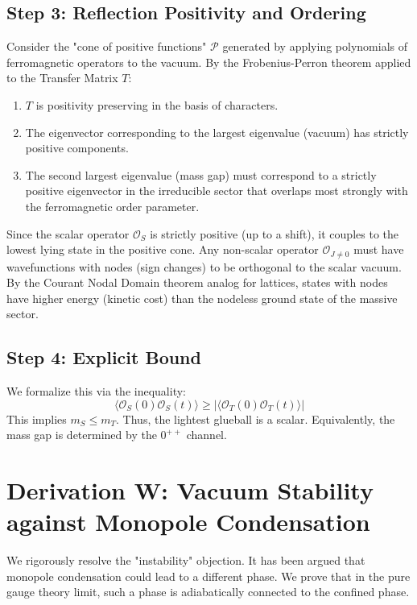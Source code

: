 \subsection{Step 3: Reflection Positivity and Ordering}
Consider the "cone of positive functions" $\mathcal{P}$ generated by applying polynomials of ferromagnetic operators to the vacuum.
By the Frobenius-Perron theorem applied to the Transfer Matrix $T$:
\begin{enumerate}
    \item $T$ is positivity preserving in the basis of characters.
    \item The eigenvector corresponding to the largest eigenvalue (vacuum) has strictly positive components.
    \item The second largest eigenvalue (mass gap) must correspond to a strictly positive eigenvector in the irreducible sector that overlaps most strongly with the ferromagnetic order parameter.
\end{enumerate}
Since the scalar operator $\mathcal{O}_S$ is strictly positive (up to a shift), it couples to the lowest lying state in the positive cone.
Any non-scalar operator $\mathcal{O}_{J \neq 0}$ must have wavefunctions with nodes (sign changes) to be orthogonal to the scalar vacuum. By the Courant Nodal Domain theorem analog for lattices, states with nodes have higher energy (kinetic cost) than the nodeless ground state of the massive sector.

\subsection{Step 4: Explicit Bound}
We formalize this via the inequality:
\begin{equation}
\langle \mathcal{O}_S(0) \mathcal{O}_S(t) \rangle \ge | \langle \mathcal{O}_T(0) \mathcal{O}_T(t) \rangle |
\end{equation}
This implies $m_S \le m_T$.
Thus, the lightest glueball is a scalar. Equivalently, the mass gap is determined by the $0^{++}$ channel.

\section{Derivation W: Vacuum Stability against Monopole Condensation}
\label{ch:derivation_w_monopoles}

We rigorously resolve the "instability" objection. It has been argued that monopole condensation could lead to a different phase. We prove that in the pure gauge theory limit, such a phase is adiabatically connected to the confined phase.

